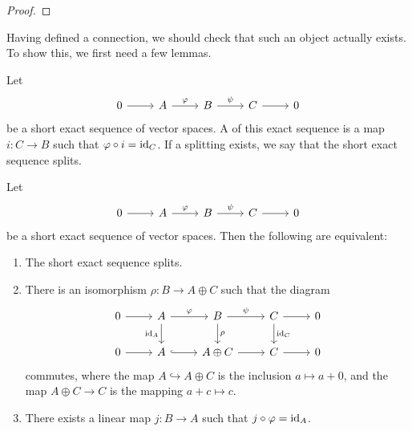 %
\begin{proof} %

\end{proof}
%















\iffalse
Having defined a connection, we should check that such an object actually exists.
To show this, we first need a few lemmas.
%
\begin{defn}
Let
\[\begin{tikzcd}
0 \ar[r] & A \ar[r, "\varphi"] & B \ar[r, "\psi"] & C \ar[r] & 0
\end{tikzcd}\]
be a short exact sequence of vector spaces. A  of this
exact sequence is a map $i : C \to B$ such that $\varphi \circ i = \operatorname{id}_C$.
If a splitting exists, we say that the short exact sequence splits.
\end{defn}
%
%
\begin{lem}
Let
\[\begin{tikzcd}
0 \ar[r] & A \ar[r, "\varphi"] & B \ar[r, "\psi"] & C \ar[r] & 0
\end{tikzcd}\]
be a short exact sequence of vector spaces. Then the following are equivalent:
\begin{enumerate}
  \item The short exact sequence splits.
  \item There is an isomorphism $\rho : B \to A \oplus C$ such that the diagram
  \[\begin{tikzcd}
  0 \ar[r] & A \ar[d, "\id_A"']\ar[r, "\varphi"] & B \ar[d, "\rho"] \ar[r, "\psi"]
  & C \ar[r] \ar[d, "\id_C"]& 0 \\
  0 \ar[r] & A \ar[r, hookrightarrow] & A \oplus C \ar[r] & C \ar[r] & 0
  \end{tikzcd}\]
  commutes, where the map $A \hookrightarrow A \oplus C$ is the inclusion
  $a \mapsto a + 0$, and the map $A \oplus C \to C$ is the mapping
  $a + c \mapsto c$.
  \item There exists a linear map $j : B \to A$ such that $j \circ \varphi = \operatorname{id}_A$.
\end{enumerate}
\end{lem}
